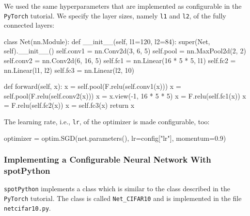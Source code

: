 \documentclass[
  letterpaper,
  DIV=11,
  numbers=noendperiod]{scrreprt}
\newenvironment{Shaded}{\begin{snugshade}}{\end{snugshade}}
\newcommand{\NormalTok}[1]{\textcolor[rgb]{0.00,0.23,0.31}{#1}}
\begin{document}
We used the same hyperparameters that are implemented as configurable in
the \texttt{PyTorch} tutorial. We specify the layer sizes, namely
\texttt{l1} and \texttt{l2}, of the fully connected layers:

\begin{Shaded}
\begin{Highlighting}[]
\NormalTok{class Net(nn.Module):}
\NormalTok{    def \_\_init\_\_(self, l1=120, l2=84):}
\NormalTok{        super(Net, self).\_\_init\_\_()}
\NormalTok{        self.conv1 = nn.Conv2d(3, 6, 5)}
\NormalTok{        self.pool = nn.MaxPool2d(2, 2)}
\NormalTok{        self.conv2 = nn.Conv2d(6, 16, 5)}
\NormalTok{        self.fc1 = nn.Linear(16 * 5 * 5, l1)}
\NormalTok{        self.fc2 = nn.Linear(l1, l2)}
\NormalTok{        self.fc3 = nn.Linear(l2, 10)}

\NormalTok{    def forward(self, x):}
\NormalTok{        x = self.pool(F.relu(self.conv1(x)))}
\NormalTok{        x = self.pool(F.relu(self.conv2(x)))}
\NormalTok{        x = x.view({-}1, 16 * 5 * 5)}
\NormalTok{        x = F.relu(self.fc1(x))}
\NormalTok{        x = F.relu(self.fc2(x))}
\NormalTok{        x = self.fc3(x)}
\NormalTok{        return x}
\end{Highlighting}
\end{Shaded}

The learning rate, i.e., \texttt{lr}, of the optimizer is made
configurable, too:

\begin{Shaded}
\begin{Highlighting}[]
\NormalTok{optimizer = optim.SGD(net.parameters(), lr=config["lr"], momentum=0.9)}
\end{Highlighting}
\end{Shaded}

\hypertarget{sec-implementation-with-spotpython-14}{%
\subsubsection{Implementing a Configurable Neural Network With
spotPython}\label{sec-implementation-with-spotpython-14}}

\texttt{spotPython} implements a class which is similar to the class
described in the \texttt{PyTorch} tutorial. The class is called
\texttt{Net\_CIFAR10} and is implemented in the file
\texttt{netcifar10.py}.
\end{document}
